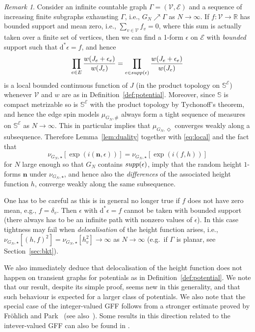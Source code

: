 \documentclass[11pt, reqno]{amsart}
\numberwithin{equation}{section}
\theoremstyle{definition}
\theoremstyle{remark}
\newtheorem{remark}{Remark}
\renewcommand{\d}{\mathrm{d}}
\newcommand{\J}{J}
\newcommand{\n}{\mathbf{n}}
\newcommand{\exact}{\star}
\newcommand{\coclosed}{\Diamond}
\begin{document}
\begin{remark} \label{rem:tightness}
	Consider an infinite countable graph $\Gamma=(\mathscr V, \mathscr E)$ and a sequence of increasing finite subgraphs exhausting $\Gamma$, i.e., $G_N \nearrow \Gamma$ as $N\to \infty$.
	If $f: \mathscr V\to \mathbb R$ has bounded support and mean zero, i.e., $\sum_{v\in \mathscr V} f_v=0$, where this sum is actually taken over a finite set of vertices, then we can find a 1-form $\epsilon$ on $\mathscr E$ with \emph{bounded} support such that $\d^* \epsilon=f$, and hence 
	\begin{align}\label{eq:local}
	\prod_{e\in E} \frac{w  (\J_{e}+\epsilon_e )}{w  (\J_{e})}=\prod_{e\in \textnormal{supp} (\epsilon)} \frac{w  (\J_{e}+\epsilon_e )}{w  (\J_{e})}
	\end{align}
	is a local bounded continuous function of $\J$ (in the product topology on $\mathbb S^{\mathscr E}$) whenever $\mathcal V$ and $w$ are as in Definition~\ref{def:potential}. Moreover, since $\mathbb S$ is compact metrizable so is $\mathbb S^{\mathscr E}$ with the product topology by Tychonoff's theorem, 
	and hence the edge spin models $\mu_{G_N,\#}$ always form a tight sequence of measures on $\mathbb S^{\mathscr E}$ as $N\to \infty$. 
	This in particular implies that $\mu_{G_N,\coclosed}$ converges weakly along a subsequence.
	Therefore Lemma~\ref{lem:duality} together with \eqref{eq:local} and the fact that
	\[
		\nu_{G_N,\exact} [\exp({i (\n, \epsilon)}) ]=\nu_{G_N,\exact} [\exp({ i (f, h)}) ]
	\]  
	for $N$ large enough so that $G_N$ contains $\textnormal{supp} (\epsilon)$, imply that the random height $1$-forms $\n$ under $\nu_{G_N,\exact}$, and hence also the \emph{differences} of the associated height function $h$, converge weakly along the same subsequence. 
	
One has to be careful as this is in general no longer true if $f$ does not have zero mean, e.g., $f=\delta_v$. Then $\epsilon$ with $\d^* \epsilon=f$ cannot be taken with bounded support 
(there always has to be an infinite path with nonzero values of $\epsilon$).
In this case tightness may fail when \emph{delocalisation} of the height function arises, i.e., $\nu_{G_N,\exact}[(h, f)^2]= \nu_{G_N,\exact}[h_v^2]\to \infty$ 
as $N\to \infty$ (e.g.\ if $\Gamma$ is planar, see Section~\ref{sec:bkt}).
\end{remark}





We also immediately deduce that delocalisation of the height function does not happen on transient graphs for potentials as in Definition~\ref{def:potential}.
We note that our result, despite its simple proof, seems new in this generality, and that such behaviour is expected for a larger class of potentials. 
We also note that the special case of the integer-valued GFF follows from a stronger estimate proved by Fr\"{o}hlich and Park~\cite{FroPar} (see also~\cite{KP}).
Some results in this direction related to the intever-valued GFF can also be found in \cite{AHPS}.
\end{document}
